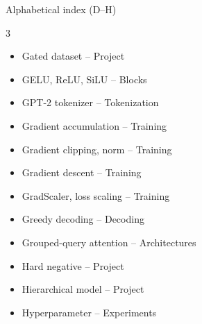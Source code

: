 \documentclass[aspectratio=169,11pt]{beamer}
\begin{document}
\begin{frame}{Alphabetical index (D--H)}
\begin{multicols}{3}
\begin{itemize}
    \item Gated dataset -- Project
    \item GELU, ReLU, SiLU -- Blocks
    \item GPT-2 tokenizer -- Tokenization
    \item Gradient accumulation -- Training
    \item Gradient clipping, norm -- Training
    \item Gradient descent -- Training
    \item GradScaler, loss scaling -- Training
    \item Greedy decoding -- Decoding
    \item Grouped-query attention -- Architectures
    \item Hard negative -- Project
    \item Hierarchical model -- Project
    \item Hyperparameter -- Experiments
  \end{itemize}
  \end{multicols}
\end{frame}
\end{document}
